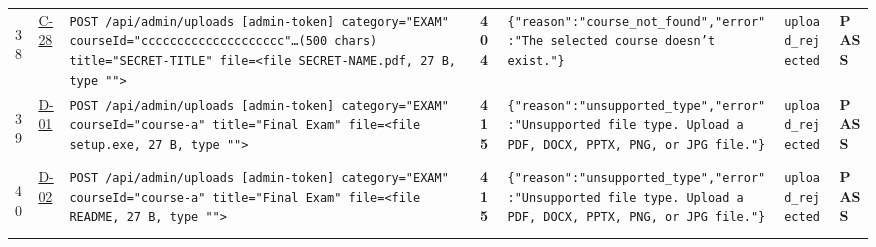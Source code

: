 \documentclass[10pt,a4paper]{article}
\begin{document}
\begin{landscape}
\begin{longtable}{@{}P{0.6cm}P{0.9cm}P{8.5cm}P{1.0cm}P{6.2cm}P{4.2cm}P{1.1cm}@{}}
\hypertarget{call38}{38} & \hyperlink{test-C-28}{C-28} & \texttt{POST /\allowbreak{}api/\allowbreak{}admin/\allowbreak{}uploads [admin-\allowbreak{}token] category=\allowbreak{}"\allowbreak{}EXAM"\allowbreak{} courseId=\allowbreak{}"\allowbreak{}cccccccccccccccccc\allowbreak{}cc"\allowbreak{}…(500 chars) title=\allowbreak{}"\allowbreak{}SECRET-\allowbreak{}TITLE"\allowbreak{} file=\allowbreak{}<file SECRET-\allowbreak{}NAME.\allowbreak{}pdf,\allowbreak{} 27 B,\allowbreak{} type "\allowbreak{}"\allowbreak{}>} & \textcolor{warnamber}{\textbf{404}} & \texttt{\{"\allowbreak{}reason"\allowbreak{}:\allowbreak{}"\allowbreak{}course\_\allowbreak{}not\_\allowbreak{}found"\allowbreak{},\allowbreak{}"\allowbreak{}error"\allowbreak{}:\allowbreak{}"\allowbreak{}The selected course doesn't exist.\allowbreak{}"\allowbreak{}\}} & \texttt{upload\_\allowbreak{}rejected} & \textcolor{passgreen}{\textbf{PASS}} \\
\hypertarget{call39}{39} & \hyperlink{test-D-01}{D-01} & \texttt{POST /\allowbreak{}api/\allowbreak{}admin/\allowbreak{}uploads [admin-\allowbreak{}token] category=\allowbreak{}"\allowbreak{}EXAM"\allowbreak{} courseId=\allowbreak{}"\allowbreak{}course-\allowbreak{}a"\allowbreak{} title=\allowbreak{}"\allowbreak{}Final Exam"\allowbreak{} file=\allowbreak{}<file setup.\allowbreak{}exe,\allowbreak{} 27 B,\allowbreak{} type "\allowbreak{}"\allowbreak{}>} & \textcolor{warnamber}{\textbf{415}} & \texttt{\{"\allowbreak{}reason"\allowbreak{}:\allowbreak{}"\allowbreak{}unsupported\_\allowbreak{}type"\allowbreak{},\allowbreak{}"\allowbreak{}error"\allowbreak{}:\allowbreak{}"\allowbreak{}Unsupported file type.\allowbreak{} Upload a PDF,\allowbreak{} DOCX,\allowbreak{} PPTX,\allowbreak{} PNG,\allowbreak{} or JPG file.\allowbreak{}"\allowbreak{}\}} & \texttt{upload\_\allowbreak{}rejected} & \textcolor{passgreen}{\textbf{PASS}} \\
\hypertarget{call40}{40} & \hyperlink{test-D-02}{D-02} & \texttt{POST /\allowbreak{}api/\allowbreak{}admin/\allowbreak{}uploads [admin-\allowbreak{}token] category=\allowbreak{}"\allowbreak{}EXAM"\allowbreak{} courseId=\allowbreak{}"\allowbreak{}course-\allowbreak{}a"\allowbreak{} title=\allowbreak{}"\allowbreak{}Final Exam"\allowbreak{} file=\allowbreak{}<file README,\allowbreak{} 27 B,\allowbreak{} type "\allowbreak{}"\allowbreak{}>} & \textcolor{warnamber}{\textbf{415}} & \texttt{\{"\allowbreak{}reason"\allowbreak{}:\allowbreak{}"\allowbreak{}unsupported\_\allowbreak{}type"\allowbreak{},\allowbreak{}"\allowbreak{}error"\allowbreak{}:\allowbreak{}"\allowbreak{}Unsupported file type.\allowbreak{} Upload a PDF,\allowbreak{} DOCX,\allowbreak{} PPTX,\allowbreak{} PNG,\allowbreak{} or JPG file.\allowbreak{}"\allowbreak{}\}} & \texttt{upload\_\allowbreak{}rejected} & \textcolor{passgreen}{\textbf{PASS}} \\

\end{longtable}
\end{landscape}
\end{document}
